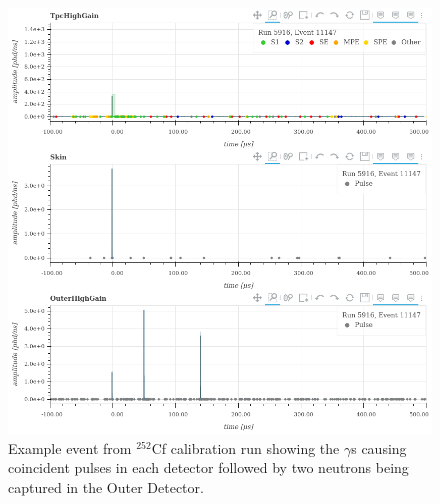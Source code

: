 \begin{figure}[]
\includegraphics[width=\textwidth]{Figures/NeutronCaptureTime/cf252_eventviewer_5916.png}
\centering
\caption{Example event from ${}^{252}$Cf calibration run showing the $\gamma$s causing coincident pulses in each detector followed by two neutrons being captured in the Outer Detector.}
\label{fig:cf252_event_viewer}
\end{figure}

